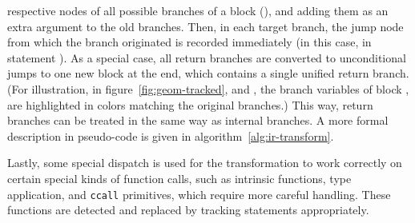 respective nodes of all possible branches of a block (), and adding them as an extra
argument to the old branches.  Then, in each target branch, the jump node from which the branch
originated is recorded immediately (in this case, in statement ).  As a special case,
all return branches are converted to unconditional jumps to one new block at the end, which contains
a single unified return branch.  (For illustration, in figure~\ref{fig:geom-tracked}, 
and , the branch variables of block , are highlighted in colors matching the
original branches.)  This way, return branches can be treated in the same way as internal branches.
A more formal description in pseudo-code is given in algorithm~\ref{alg:ir-transform}.

Lastly, some special dispatch is used for the transformation to work correctly on certain special
kinds of function calls, such as intrinsic functions, type application, and \texttt{ccall}
primitives, which require more careful handling.  These functions are detected and replaced by
 tracking statements appropriately.

